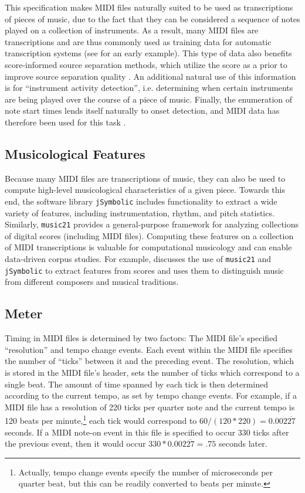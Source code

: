 \documentclass{article}
\begin{document}
This specification makes MIDI files naturally suited to be used as transcriptions of pieces of music, due to the fact that they can be considered a sequence of notes played on a collection of instruments.
As a result, many MIDI files are transcriptions and are thus commonly used as training data for automatic transcription systems (see \cite{turetsky2003ground} for an early example).
This type of data also benefits score-informed source separation methods, which utilize the score as a prior to improve source separation quality \cite{ewert2014score}.
An additional natural use of this information is for ``instrument activity detection'', i.e. determining when certain instruments are being played over the course of a piece of music.
Finally, the enumeration of note start times lends itself naturally to onset detection, and MIDI data has therefore been used for this task \cite{bello2005tutorial}.

\subsection{Musicological Features}

Because many MIDI files are transcriptions of music, they can also be used to compute high-level musicological characteristics of a given piece.
Towards this end, the software library \texttt{jSymbolic} \cite{mckay2006jsymbolic} includes functionality to extract a wide variety of features, including instrumentation, rhythm, and pitch statistics.
Similarly, \texttt{music21} \cite{cuthbert2010music21} provides a general-purpose framework for analyzing collections of digital scores (including MIDI files).
Computing these features on a collection of MIDI transcriptions is valuable for computational musicology and can enable data-driven corpus studies.
For example, \cite{cuthbert2011feature} discusses the use of \texttt{music21} and \texttt{jSymbolic} to extract features from scores and uses them to distinguish music from different composers and musical traditions.

\subsection{Meter}

Timing in MIDI files is determined by two factors: The MIDI file's specified ``resolution'' and tempo change events.
Each event within the MIDI file specifies the number of ``ticks'' between it and the preceding event.
The resolution, which is stored in the MIDI file's header, sets the number of ticks which correspond to a single beat.
The amount of time spanned by each tick is then determined according to the current tempo, as set by tempo change events.
For example, if a MIDI file has a resolution of 220 ticks per quarter note and the current tempo is 120 beats per minute,\footnote{Actually, tempo change events specify the number of microseconds per quarter beat, but this can be readily converted to beats per minute.} each tick would correspond to $60/(120*220) = 0.002\overline{27}$ seconds.
If a MIDI note-on event in this file is specified to occur 330 ticks after the previous event, then it would occur $330*0.002\overline{27} = .75$ seconds later.
\end{document}
